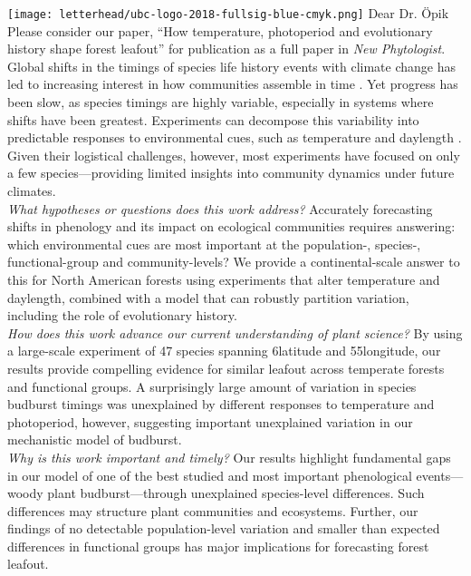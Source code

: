 \documentclass[11pt,a4paper]{article}
\begin{document}
\noindent \texttt{[image: letterhead/ubc-logo-2018-fullsig-blue-cmyk.png]}
\noindent Dear Dr. Öpik
\vspace{1.5ex}\\
\noindent Please consider our paper, ``How temperature, photoperiod and evolutionary history shape forest leafout'' for publication as a full paper in \emph{New Phytologist}. 
\vspace{1.5ex}\\ 
Global shifts in the timings of species life history events with climate change has led to increasing interest in how communities assemble in time \citep{Cope2022, Cleland2024}. Yet progress has been slow, as species timings are highly variable, especially in systems where shifts have been greatest. Experiments can decompose this variability into predictable responses to environmental cues, such as temperature and daylength \citep{Basler2014,Vitasse2014,Zohner2016}. Given their logistical challenges, however, most experiments have focused on only a few species---providing limited insights into community dynamics under future climates.
\vspace{1.5ex}\\ 
\noindent \textit{What hypotheses or questions does this work address?} Accurately forecasting shifts in phenology and its impact on ecological communities requires answering: which environmental cues are most important at the population-, species-, functional-group and community-levels? We provide a continental-scale answer to this for North American forests using experiments that alter temperature and daylength, combined with a model that can robustly partition variation, including the role of evolutionary history. %
\vspace{1.5ex}\\ 
\noindent \textit{How does this work advance our current understanding of plant science?}  By using a large-scale experiment of 47 species spanning 6\textdegree latitude and 55\textdegree longitude, our results provide compelling evidence for similar leafout across temperate forests and functional groups. A surprisingly large amount of variation in species budburst timings was unexplained by different responses to temperature and photoperiod, however, suggesting important unexplained variation in our mechanistic model of budburst.  %
\vspace{1.5ex}\\
\noindent \textit{Why is this work important and timely?} Our results highlight fundamental gaps in our model of one of the best studied and most important phenological events---woody plant budburst---through unexplained species-level differences. Such differences may structure plant communities and ecosystems. Further, our findings of no detectable population-level variation and smaller than expected differences in functional groups has major implications for forecasting forest leafout. %
\end{document}
